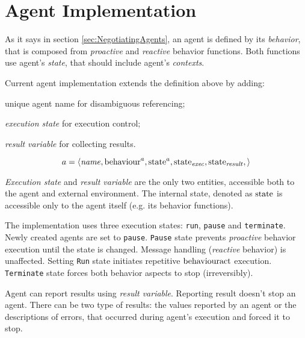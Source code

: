 \documentclass[../header]{subfiles}
\begin{document}
\providecommand{\rootdir}{..}


\section{Agent Implementation}


As it says in section \ref{sec:NegotiatingAgents}, an agent is defined by its
\emph{behavior}, that is composed from \emph{proactive} and \emph{reactive}
behavior functions. Both functions use agent's \emph{state}, that should include
agent's \emph{contexts}.

Current agent implementation extends the definition above by adding:
\begin{enumerate*}[1)]
  \item unique agent name for disambiguous referencing;
  \item \emph{execution state} for execution control;
  \item \emph{result variable} for collecting results.
\end{enumerate*}

$$ a = \left< \mathit{name},
              \mathrm{behaviour}^a,
              \mathrm{state}^a,
              \mathrm{state}_\mathit{exec},
              \mathrm{state}_\mathit{result},
       \right> $$

\noindent
\emph{Execution state} and \emph{result variable} are the only two entities,
accessible both to the agent and external environment. The internal state,
denoted as $\mathrm{state}$ is accessible only to the agent itself (e.g. its behavior functions).


The implementation uses three execution states: \texttt{run}, \texttt{pause}
and \texttt{terminate}. Newly created agents are set to \texttt{pause}.
\texttt{Pause} state prevents \emph{proactive} behavior execution until the state is changed.
Message handling (\emph{reactive} behavior) is unaffected.
Setting \texttt{Run} state initiates repetitive $\mathrm{behaviour}\mathrm{act}$ execution.
\texttt{Terminate} state forces both behavior aspects to stop (irreversibly).

Agent can report results using \emph{result variable}.
Reporting result doesn't stop an agent.
There can be two type of results: the values reported by an agent or
the descriptions of errors, that occurred during agent's execution
and forced it to stop.
\end{document}
